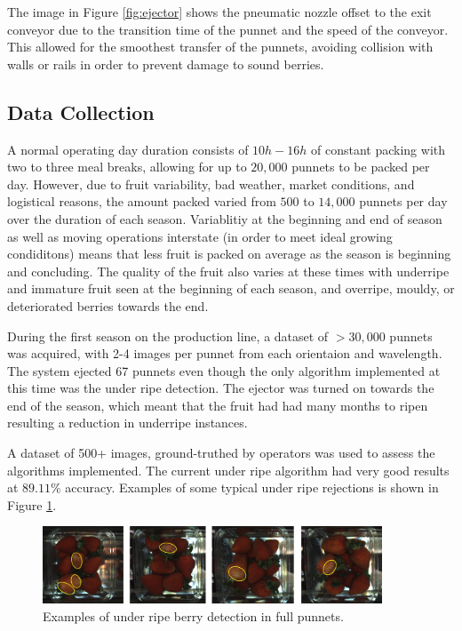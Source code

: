 \documentclass[fleqn,twoside,12pt]{report}
\begin{document}
The image in Figure \ref{fig:ejector} shows the pneumatic nozzle offset to the exit conveyor due to the transition time of the punnet and the speed of the conveyor. This allowed for the smoothest transfer of the punnets, avoiding collision with walls or rails in order to prevent damage to sound berries.


\subsection{Data Collection}

A normal operating day duration consists of $10h-16h$ of constant packing with two to three meal breaks, allowing for up to $20,000$ punnets to be packed per day. However, due to fruit variability, bad weather, market conditions, and logistical reasons, the amount packed varied from $500$ to $14,000$ punnets per day over the duration of each season. Variablitiy at the beginning and end of season as well as moving operations interstate (in order to meet ideal growing condiditons) means that less fruit is packed on average as the season is beginning and concluding. The quality of the fruit also varies at these times with underripe and immature fruit seen at the beginning of each season, and overripe, mouldy, or deteriorated berries towards the end.


During the first season on the production line, a dataset of $>30,000$ punnets was acquired, with 2-4 images per punnet from each orientaion and wavelength. The system ejected 67 punnets even though the only algorithm implemented at this time was the under ripe detection. The ejector was turned on towards the end of the season, which meant that the fruit had had many months to ripen resulting a reduction in underripe instances.  

A dataset of 500+ images, ground-truthed by operators was used to assess the algorithms implemented. The current under ripe algorithm had very good results at $89.11\%$ accuracy. Examples of some typical under ripe rejections is shown in Figure \ref{fig:UR_berries}.


\begin{figure}[h]
	\centering
	\includegraphics[width=0.9\textwidth]{UR_berries.png}
	\caption{Examples of under ripe berry detection in full punnets.}
	\label{fig:UR_berries}
\end{figure}
\end{document}
